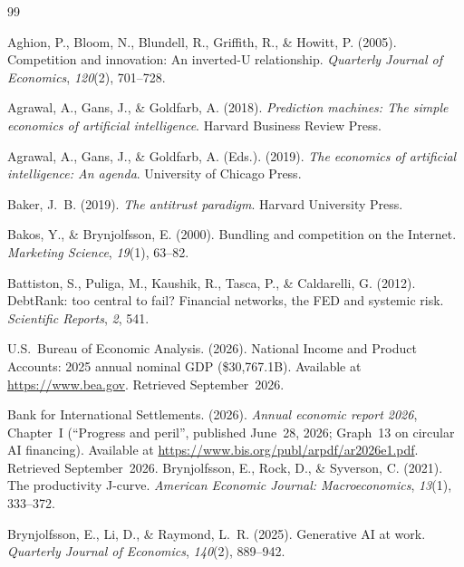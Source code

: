 \documentclass[11pt,a4paper]{article}
\begin{document}
\begin{thebibliography}{99}

Aghion, P., Bloom, N., Blundell, R., Griffith, R., \& Howitt, P. (2005).
Competition and innovation: An inverted-U relationship.
\emph{Quarterly Journal of Economics}, \emph{120}(2), 701--728.

Agrawal, A., Gans, J., \& Goldfarb, A. (2018).
\emph{Prediction machines: The simple economics of artificial intelligence}.
Harvard Business Review Press.

Agrawal, A., Gans, J., \& Goldfarb, A. (Eds.). (2019).
\emph{The economics of artificial intelligence: An agenda}.
University of Chicago Press.

Baker, J.~B. (2019).
\emph{The antitrust paradigm}.
Harvard University Press.

Bakos, Y., \& Brynjolfsson, E. (2000).
Bundling and competition on the Internet.
\emph{Marketing Science}, \emph{19}(1), 63--82.

Battiston, S., Puliga, M., Kaushik, R., Tasca, P., \& Caldarelli, G. (2012).
DebtRank: too central to fail? Financial networks, the FED and systemic risk.
\emph{Scientific Reports}, \emph{2}, 541.

U.S.~Bureau of Economic Analysis. (2026).
National Income and Product Accounts: 2025 annual nominal GDP (\$30,767.1B).
Available at \url{https://www.bea.gov}.
Retrieved September~2026.

Bank for International Settlements. (2026).
\emph{Annual economic report 2026}, Chapter~I (``Progress and peril'',
published June~28, 2026; Graph~13 on circular AI financing).
Available at \url{https://www.bis.org/publ/arpdf/ar2026e1.pdf}.
Retrieved September~2026.
Brynjolfsson, E., Rock, D., \& Syverson, C. (2021).
The productivity J-curve.
\emph{American Economic Journal: Macroeconomics}, \emph{13}(1), 333--372.

Brynjolfsson, E., Li, D., \& Raymond, L.~R. (2025).
Generative AI at work.
\emph{Quarterly Journal of Economics}, \emph{140}(2), 889--942.


\end{thebibliography}
\end{document}
